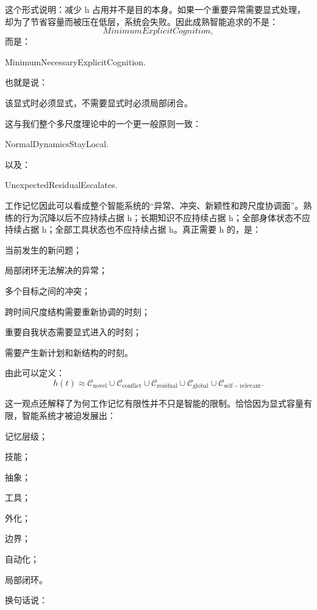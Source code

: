 这个形式说明：减少 h 占用并不是目的本身。如果一个重要异常需要显式处理，却为了节省容量而被压在低层，系统会失败。因此成熟智能追求的不是：
\[
MinimumExplicitCognition,
\]
而是：
\begin{statementbox}
MinimumNecessaryExplicitCognition.
\end{statementbox}

也就是说：
\begin{statementbox}
该显式时必须显式，不需要显式时必须局部闭合。
\end{statementbox}

这与我们整个多尺度理论中的一个更一般原则一致：
\begin{statementbox}
NormalDynamicsStayLocal.
\end{statementbox}
以及：
\begin{statementbox}
UnexpectedResidualEscalates.
\end{statementbox}

工作记忆因此可以看成整个智能系统的“异常、冲突、新颖性和跨尺度协调面”。熟练的行为沉降以后不应持续占据 h；长期知识不应持续占据 h；全部身体状态不应持续占据 h；全部工具状态也不应持续占据 h。真正需要 h 的，是：

当前发生的新问题；

局部闭环无法解决的异常；

多个目标之间的冲突；

跨时间尺度结构需要重新协调的时刻；

重要自我状态需要显式进入的时刻；

需要产生新计划和新结构的时刻。

由此可以定义：
\[
h(t)
\approx
\mathcal C_{\mathrm{novel}}
\cup
\mathcal C_{\mathrm{conflict}}
\cup
\mathcal C_{\mathrm{residual}}
\cup
\mathcal C_{\mathrm{global}}
\cup
\mathcal C_{\mathrm{self-relevant}}.
\]

这一观点还解释了为何工作记忆有限性并不只是智能的限制。恰恰因为显式容量有限，智能系统才被迫发展出：

记忆层级；

技能；

抽象；

工具；

外化；

边界；

自动化；

局部闭环。

换句话说：
\begin{statementbox}
\centering
{}
\end{statementbox}

